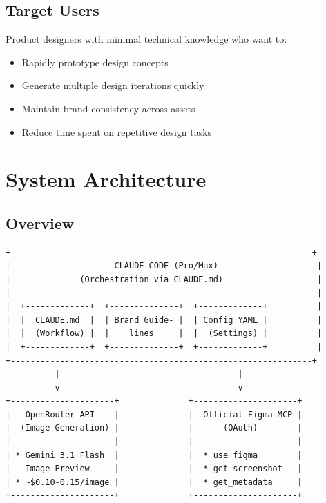 \documentclass[11pt,a4paper]{article}
\begin{document}
\subsection{Target Users}
Product designers with minimal technical knowledge who want to:
\begin{itemize}
    \item Rapidly prototype design concepts
    \item Generate multiple design iterations quickly
    \item Maintain brand consistency across assets
    \item Reduce time spent on repetitive design tasks
\end{itemize}

\section{System Architecture}

\subsection{Overview}

\begin{verbatim}
+-------------------------------------------------------------+
|                     CLAUDE CODE (Pro/Max)                    |
|              (Orchestration via CLAUDE.md)                   |
|                                                              |
|  +-------------+  +--------------+  +-------------+          |
|  |  CLAUDE.md  |  | Brand Guide- |  | Config YAML |          |
|  |  (Workflow) |  |    lines     |  |  (Settings) |          |
|  +-------------+  +--------------+  +-------------+          |
+-------------------------------------------------------------+
          |                                    |
          v                                    v
+---------------------+              +---------------------+
|   OpenRouter API    |              |  Official Figma MCP |
|  (Image Generation) |              |      (OAuth)        |
|                     |              |                     |
| * Gemini 3.1 Flash  |              |  * use_figma        |
|   Image Preview     |              |  * get_screenshot   |
| * ~$0.10-0.15/image |              |  * get_metadata     |
+---------------------+              +---------------------+
\end{verbatim}
\end{document}
